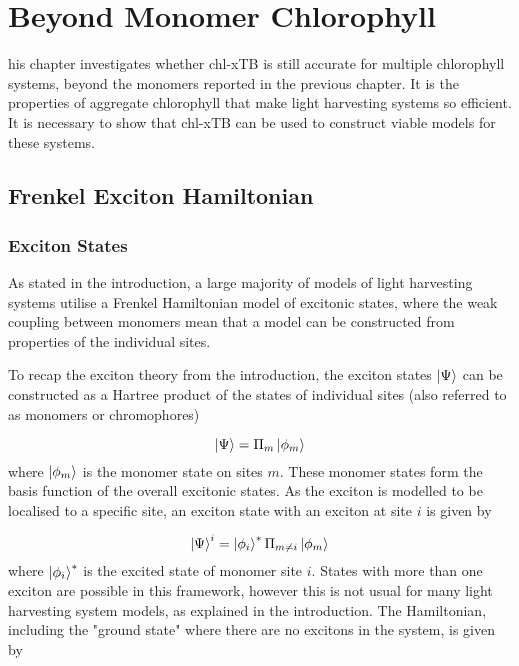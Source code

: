 %
%
\let\textcircled=\pgftextcircled
\chapter{Beyond Monomer Chlorophyll}
\label{chap:excitons}

his chapter investigates whether  chl-xTB is still accurate for multiple 
chlorophyll systems, beyond the monomers reported in the previous chapter. It is
the properties of aggregate chlorophyll that make light harvesting systems so efficient.
It is necessary to show that chl-xTB can be used to construct viable models for
these systems.

\section{Frenkel Exciton Hamiltonian}
\label{sec:exciton_theory}

\subsection{Exciton States}
\label{subsec:exciton_states}
As stated in the introduction, a large majority of models of light harvesting systems
utilise a Frenkel Hamiltonian model of excitonic states, where the weak coupling
between monomers mean that a model can be constructed from properties of the individual
sites.

To recap the exciton theory from the introduction, the exciton states $\ket{\Psi}$ can
be constructed as a Hartree product of the states of individual sites (also referred
to as monomers or chromophores)

\begin{equation}
    \ket{\Psi} = \Pi_m \ket{\phi_m}
\end{equation}
%
where $\ket{\phi_m}$ is the monomer state on sites $m$. These monomer states form
the basis function of the overall excitonic states. As the exciton is modelled to
be localised to a specific site, an exciton state with an exciton at site $i$ is
given by

\begin{equation}
    \ket{\Psi}^i = \ket{\phi_i}^\ast \Pi_{m \neq i}  \ket{\phi_m}
\end{equation}
%
where $\ket{\phi_i}^\ast$ is the excited state of monomer site $i$. States with 
more than one exciton are possible in this framework, however this is not usual 
for many light harvesting system models, as explained in the introduction. The Hamiltonian, 
including the "ground state" where there are no excitons in the system, is given 
by

